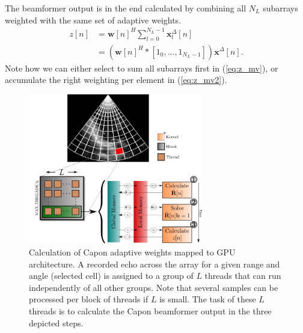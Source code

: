 \documentclass[journal]{IEEEtran}
\renewcommand{\vec}[1]{\mathbf{#1}}
\begin{document}
The beamformer output is in the end calculated by combining all $N_L$ subarrays weighted with the same set of adaptive weights.
\begin{align}
z[n] &= \vec{w}[n]^H \sum_{l=0}^{N_L-1} \vec{x}_l^{\Delta}[n] \label{eq:z_mv}\\
&= (\vec{w}[n]^H \ast{} [1_0, ..., 1_{N_L-1}])\vec{x}^{\Delta}[n] \label{eq:z_mv2}.
\end{align}
Note how we can either select to sum all subarrays first in (\ref{eq:z_mv}), or accumulate the right weighting per element in (\ref{eq:z_mv2}).

\begin{figure}
\centerline{\includegraphics[width=3in]{gfx/gpu_layout_vertical_lr.png}}
\caption{Calculation of Capon adaptive weights mapped to GPU architecture. A recorded echo across the array for a given range and angle (selected cell) is assigned to a group of $L$ threads that can run independently of all other groups. Note that several samples can be processed per block of threads if $L$ is small. The task of these $L$ threads is to calculate the Capon beamformer output in the three depicted steps.}
\label{fig:gpulayout}
\end{figure}


\end{document}
